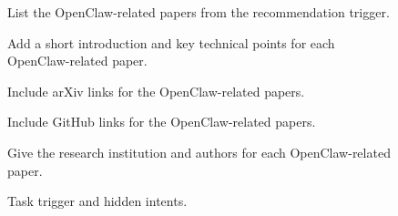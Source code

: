 \begin{figure}[h]
{    \vspace{2pt}
    \par
     List the OpenClaw-related papers from the recommendation trigger.
    \par
     Add a short introduction and key technical points for each OpenClaw-related paper.
    \par
     Include arXiv links for the OpenClaw-related papers.
    \par
     Include GitHub links for the OpenClaw-related papers.
    \par
     Give the research institution and authors for each OpenClaw-related paper.
    }
    \caption{Task trigger and hidden intents.}
    \label{fig:case_zhanghaoran_1_hidden_intent_trigger}
\end{figure}

